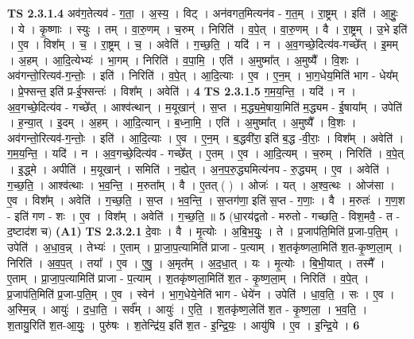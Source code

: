 \documentclass[17pt]{extarticle}
\begin{document}
                  \newline
                                \textbf{ TS 2.3.1.4} \newline
                  अव॑ग॒तेत्यव॑ - ग॒ता॒ । अ॒स्य॒ । विट् । अन॑वगत॒मित्यन॑व - ग॒त॒म् । रा॒ष्ट्रम् । इति॑ । आ॒हुः॒ । ये । कृ॒ष्णाः । स्युः । तम् । वा॒रु॒णम् । च॒रुम् । निरिति॑ । व॒पे॒त् । वा॒रु॒णम् । वै । रा॒ष्ट्रम् । उ॒भे इति॑ । ए॒व । विश᳚म् । च॒ । रा॒ष्ट्रम् । च॒ । अवेति॑ । ग॒च्छ॒ति॒ । यदि॑ । न । अ॒व॒गच्छे॒दित्य॑व-गच्छे᳚त् । इ॒मम् । अ॒हम् । आ॒दि॒त्येभ्यः॑ । भा॒गम् । निरिति॑ । व॒पा॒मि॒ । एति॑ । अ॒मुष्मा᳚त् । अ॒मुष्यै᳚ । वि॒शः । अव॑गन्तो॒रित्यव॑-ग॒न्तोः॒ । इति॑ । निरिति॑ । व॒पे॒त् । आ॒दि॒त्याः । ए॒व । ए॒न॒म् । भा॒ग॒धेय॒मिति॑ भाग - धेय᳚म् । प्रे॒फ्सन्त॒ इति॑ प्र-ई॒फ्सन्तः॑ । विश᳚म् । अवेति॑ । \textbf{  4} \newline
                  \newline
                                \textbf{ TS 2.3.1.5} \newline
                  ग॒म॒य॒न्ति॒ । यदि॑ । न । अ॒व॒गच्छे॒दित्य॑व - गच्छे᳚त् । आश्व॑त्थान् । म॒यूखान्॑ । स॒प्त । म॒द्ध्य॒मे॒षाया॒मिति॑ म॒द्ध्यम - ई॒षाया᳚म् । उपेति॑ । ह॒न्या॒त् । इ॒दम् । अ॒हम् । आ॒दि॒त्यान् । ब॒ध्ना॒मि॒ । एति॑ । अ॒मुष्मा᳚त् । अ॒मुष्यै᳚ । वि॒शः । अव॑गन्तो॒रित्यव॑-ग॒न्तोः॒ । इति॑ । आ॒दि॒त्याः । ए॒व । ए॒न॒म् । ब॒द्धवी॑रा॒ इति॑ ब॒द्ध -वी॒राः॒ । विश᳚म् । अवेति॑ । ग॒म॒य॒न्ति॒ । यदि॑ । न । अ॒व॒गच्छे॒दित्य॑व - गच्छे᳚त् । ए॒तम् । ए॒व । आ॒दि॒त्यम् । च॒रुम् । निरिति॑ । व॒पे॒त् । इ॒द्ध्मे । अपीति॑ । म॒यूखान्॑ । समिति॑ । न॒ह्ये॒त् । अ॒न॒प॒रु॒द्ध्यमित्य॑नप - रु॒द्ध्यम् । ए॒व । अवेति॑ । ग॒च्छ॒ति॒ । आश्व॑त्थाः । भ॒व॒न्ति॒ । म॒रुता᳚म् । वै । ए॒तत् ( ) । ओजः॑ । यत् । अ॒श्व॒त्थः । ओज॑सा । ए॒व । विश᳚म् । अवेति॑ । ग॒च्छ॒ति॒ । स॒प्त । भ॒व॒न्ति॒ । स॒प्तग॑णा॒ इति॑ स॒प्त - ग॒णाः॒ । वै । म॒रुतः॑ । ग॒ण॒श - इति॑ गण - शः । ए॒व । विश᳚म् । अवेति॑ । ग॒च्छ॒ति॒ ॥ \textbf{  5 } \newline
                  \newline
                      (धा॒रय॑द्वतो - मरुतो - गच्छति॒ - विश॒मवै॒ - त - द॒ष्टाद॑श च)  \textbf{(A1)} \newline \newline
                                \textbf{ TS 2.3.2.1} \newline
                  दे॒वाः । वै । मृ॒त्योः । अ॒बि॒भ॒युः॒ । ते । प्र॒जाप॑ति॒मिति॑ प्र॒जा-प॒ति॒म् । उपेति॑ । अ॒धा॒व॒न्न् । तेभ्यः॑ । ए॒ताम् । प्रा॒जा॒प॒त्यामिति॑ प्राजा - प॒त्याम् । श॒तकृ॑ष्णला॒मिति॑ श॒त-कृ॒ष्ण॒ला॒म् । निरिति॑ । अ॒व॒प॒त् । तया᳚ । ए॒व । ए॒षु॒ । अ॒मृत᳚म् । अ॒द॒धा॒त् । यः । मृ॒त्योः । बि॒भी॒यात् । तस्मै᳚ । ए॒ताम् । प्रा॒जा॒प॒त्यामिति॑ प्राजा - प॒त्याम् । श॒तकृ॑ष्णला॒मिति॑ श॒त - कृ॒ष्ण॒ला॒म् । निरिति॑ । व॒पे॒त् । प्र॒जाप॑ति॒मिति॑ प्र॒जा-प॒ति॒म् । ए॒व । स्वेन॑ । भा॒ग॒धेये॒नेति॑ भाग - धेये॑न । उपेति॑ । धा॒व॒ति॒ । सः । ए॒व । अ॒स्मि॒न्न् । आयुः॑ । द॒धा॒ति॒ । सर्व᳚म् । आयुः॑ । ए॒ति॒ । श॒तकृ॑ष्ण॒लेति॑ श॒त - कृ॒ष्ण॒ला॒ । भ॒व॒ति॒ । श॒तायु॒रिति॑ श॒त-आ॒युः॒ । पुरु॑षः । श॒तेन्द्रि॑य॒ इति॑ श॒त - इ॒न्द्रि॒यः॒ । आयु॑षि । ए॒व । इ॒न्द्रि॒ये । \textbf{  6} \newline
\end{document}
